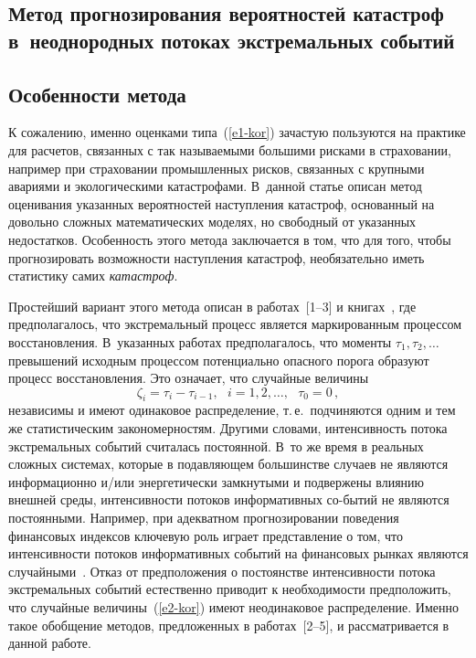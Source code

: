 \begin{multicols}{2}

\section{Метод прогнозирования вероятностей катастроф 
в~неоднородных потоках экстремальных событий}

\subsection{Особенности метода}

К сожалению, именно оценками типа~(\ref{e1-kor}) за\-час\-тую пользуются на
практике для расчетов, связанных с так называемыми большими рисками
в страховании, например при страховании промышленных рисков,
связанных с крупными авариями и экологическими катастрофами. 
В~данной статье описан метод оценивания указанных вероятностей
наступления катастроф, основанный на довольно сложных математических
моделях, но свободный от указанных недостатков. Особенность этого
метода заключается в том, что для того, чтобы прогнозировать
возможности наступления катастроф, необязательно иметь статистику
самих \textit{катастроф}.

Простейший вариант этого метода описан в работах~[1--3] 
и книгах~\cite{KorolevSokolov2008, KorolevShorgin2011}, где предполагалось,
что экстремальный процесс является маркированным процессом
восстановления. В~указанных работах предполагалось, что моменты
$\tau_1,\tau_2,\ldots$ превышений исходным процессом потенциально
опасного порога образуют процесс восстановления. Это означает, что
случайные величины
\begin{equation}
\zeta_i=\tau_i-\tau_{i-1},\ \ \ i=1,2,\ldots, \ \ \
\tau_0=0\,,\label{e2-kor}
\end{equation} 
независимы и имеют одинаковое распределение, т.\,е.\ 
подчиняются одним и тем же статистическим закономерностям.
Другими словами, интенсивность потока экстремальных событий
считалась постоянной. В~то же время в реальных сложных системах,
которые в подавляющем большинстве случаев не являются информационно
и/или энергетически замкнутыми и подвержены влиянию внешней среды,
интенсивности потоков информативных со-\linebreak бытий не являются постоянными.
Например, при адекватном прогнозировании поведения фи\-нан\-совых
индексов ключевую роль играет пред\-став\-ление о том, что интенсивности
потоков ин\-формативных событий на финансовых рынках являются
случайными~\cite{Korolevetal2013}. Отказ от предположения о
постоянстве интенсивности потока экстремальных событий естественно
приводит к необходимости предположить, что случайные величины~(\ref{e2-kor})
имеют неодинаковое распределение. Именно такое обобщение методов,
предложенных в работах~[2--5], и рассматривается в данной работе.


\end{multicols}
